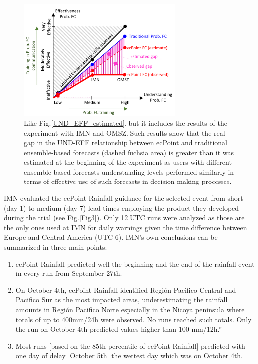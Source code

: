 \documentclass[twocol]{ametsocV5} %
\begin{document}
\begin{figure}
\centerline{\includegraphics[width=19pc]{manuscript/Figures/ProbFC_Knowledge_Effectiveness_Observed.png}}
\caption{Like Fig.\ref{UND_EFF_estimated}, but it includes the results of the experiment with IMN and OMSZ. Such results show that the real gap in the UND-EFF relationship between ecPoint and traditional ensemble-based forecasts (dashed fuchsia area) is greater than it was estimated at the beginning of the experiment as users with different ensemble-based forecasts understanding levels performed similarly in terms of effective use of such forecasts in decision-making processes.}
\label{UND_EFF_observed}
\end{figure}




IMN evaluated the ecPoint-Rainfall guidance for the selected event from short (day 1) to medium (day 7) lead times employing the product they developed during the trial (see Fig.\ref{Fig3}). Only 12 UTC runs were analyzed as those are the only ones used at IMN for daily warnings given the time difference between Europe and Central America (UTC-6). IMN’s own conclusions can be summarized in three main points:

\begin{enumerate}
\item ecPoint-Rainfall predicted well the beginning and the end of the rainfall event in every run from September 27th.
\item On October 4th, ecPoint-Rainfall identified Región Pacifico Central and Pacifico Sur as the most impacted areas, underestimating the rainfall amounts in Región Pacifico Norte especially in the Nicoya peninsula where totals of up to 400mm/24h were observed. No runs reached such totals. Only the run on October 4th predicted values higher than 100 mm/12h.”
\item Most runs [based on the 85th percentile of ecPoint-Rainfall] predicted with one day of delay [October 5th] the wettest day which was on October 4th.
\end{enumerate}
\end{document}
